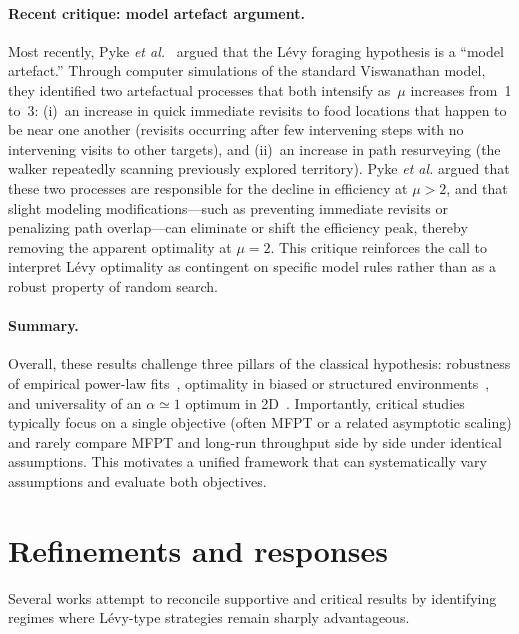 \paragraph{Recent critique: model artefact argument.}
Most recently, Pyke \emph{et al.}~\cite{pyke2026artefact} argued that the L\'evy foraging hypothesis is a ``model artefact.'' Through computer simulations of the standard Viswanathan model, they identified two artefactual processes that both intensify as~$\mu$ increases from~1 to~3: (i)~an increase in quick immediate revisits to food locations that happen to be near one another (revisits occurring after few intervening steps with no intervening visits to other targets), and (ii)~an increase in path resurveying (the walker repeatedly scanning previously explored territory). Pyke \emph{et al.} argued that these two processes are responsible for the decline in efficiency at $\mu > 2$, and that slight modeling modifications---such as preventing immediate revisits or penalizing path overlap---can eliminate or shift the efficiency peak, thereby removing the apparent optimality at $\mu = 2$. This critique reinforces the call to interpret L\'evy optimality as contingent on specific model rules rather than as a robust property of random search.

\paragraph{Summary.}
Overall, these results challenge three pillars of the classical hypothesis: robustness of empirical power-law fits~\cite{edwards2007revisiting,james2011assessing,plank2008optimal}, optimality in biased or structured environments~\cite{palyulin2014levy,volpe2017topography}, and universality of an $\alpha\simeq 1$ optimum in 2D~\cite{levernier2020inverse,pyke2026artefact}. Importantly, critical studies typically focus on a single objective (often MFPT or a related asymptotic scaling) and rarely compare MFPT and long-run throughput side by side under identical assumptions. This motivates a unified framework that can systematically vary assumptions and evaluate both objectives.

\section{Refinements and responses}
\label{sec:refinements}
Several works attempt to reconcile supportive and critical results by identifying regimes where L\'evy-type strategies remain sharply advantageous.

